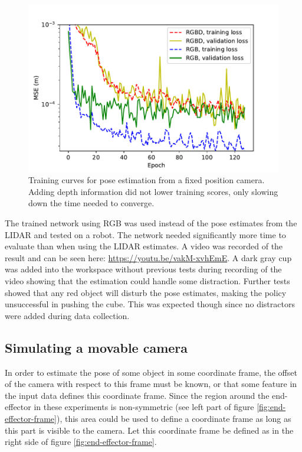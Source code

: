 \begin{figure}[h!]
    \centering
    \includegraphics[width=0.6 \textwidth]{res/depth-vs-rgb.pdf}

    \caption{Training curves for pose estimation from a fixed position camera.
    Adding depth information did not lower training scores, only slowing down
    the time needed to converge.}

    \label{fig:depth-vs-rgb}
    
\end{figure}

The trained network using RGB was used instead of the pose estimates from the
LIDAR and tested on a robot. The network needed significantly more time to
evaluate than when using the LIDAR estimates. A video was recorded of the
result and can be seen here: \url{https://youtu.be/vakM-xvhEmE}. A dark gray
cup was added into the workspace without previous tests during recording of the
video showing that the estimation could handle some distraction. Further tests
showed that any red object will disturb the pose estimates, making the policy
unsuccessful in pushing the cube. This was expected though since no distractors
were added during data collection.

\subsection{Simulating a movable camera}
\label{subsec:sim_moving}

In order to estimate the pose of some object in some coordinate frame, the
offset of the camera with respect to this frame must be known, or that some
feature in the input data defines this coordinate frame. Since the region
around the end-effector in these experiments is non-symmetric (see left part of
figure \ref{fig:end-effector-frame}), this area could be used to define a
coordinate frame as long as this part is visible to the camera. Let this
coordinate frame be defined as in the right side of figure
\ref{fig:end-effector-frame}.

